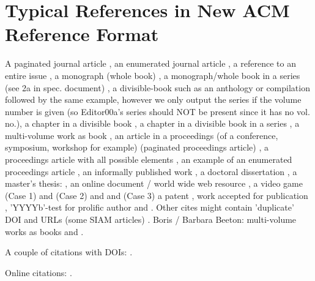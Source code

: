 \section{Typical References in New ACM Reference Format}
A paginated journal article \cite{Abril07}, an enumerated
journal article \cite{Cohen07}, a reference to an entire issue \cite{JCohen96},
a monograph (whole book) \cite{Kosiur01}, a monograph/whole book in a series (see 2a in spec. document)
\cite{Harel79}, a divisible-book such as an anthology or compilation \cite{Editor00}
followed by the same example, however we only output the series if the volume number is given
\cite{Editor00a} (so Editor00a's series should NOT be present since it has no vol. no.),
a chapter in a divisible book \cite{Spector90}, a chapter in a divisible book
in a series \cite{Douglass98}, a multi-volume work as book \cite{Knuth97},
an article in a proceedings (of a conference, symposium, workshop for example)
(paginated proceedings article) \cite{Andler79}, a proceedings article
with all possible elements \cite{Smith10}, an example of an enumerated
proceedings article \cite{VanGundy07},
an informally published work \cite{Harel78}, a doctoral dissertation \cite{Clarkson85},
a master's thesis: \cite{anisi03}, an online document / world wide web
resource \cite{Thornburg01, Ablamowicz07, Poker06}, a video game (Case 1) \cite{Obama08} and (Case 2) \cite{Novak03}
and \cite{Lee05} and (Case 3) a patent \cite{JoeScientist001},
work accepted for publication \cite{rous08}, 'YYYYb'-test for prolific author
\cite{SaeediMEJ10} and \cite{SaeediJETC10}. Other cites might contain
'duplicate' DOI and URLs (some SIAM articles) \cite{Kirschmer:2010:AEI:1958016.1958018}.
Boris / Barbara Beeton: multi-volume works as books
\cite{MR781536} and \cite{MR781537}.

A couple of citations with DOIs: \cite{2004:ITE:1009386.1010128,
  Kirschmer:2010:AEI:1958016.1958018}.

Online citations: \cite{TUGInstmem, Thornburg01, CTANacmart}.



%
%
%
%

